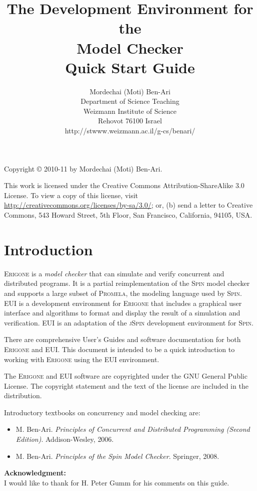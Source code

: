 \documentclass[11pt]{article}
\title{The \eui{} Development Environment for the\\
\prg{} Model Checker\\Quick Start Guide}
\author{Mordechai (Moti) Ben-Ari\\
Department of Science Teaching\\
Weizmann Institute of Science\\
Rehovot 76100 Israel\\
\textsf{http://stwww.weizmann.ac.il/g-cs/benari/}}
\newcommand*{\prg}{\textsc{Erigone}}
\newcommand*{\eui}{\textsc{EUI}}
\newcommand*{\spn}{\textsc{Spin}}
\newcommand*{\jsp}{\textsc{jSpin}}
\newcommand*{\prm}{\textsc{Promela}}
\begin{document}
\maketitle
\thispagestyle{empty}

\vfill

\begin{center}
Copyright \copyright{} 2010-11 by Mordechai (Moti) Ben-Ari.
\end{center}
This work is licensed under the Creative Commons Attribution-ShareAlike 3.0
License. To view a copy of this license, visit
\url{http://creativecommons.org/licenses/by-sa/3.0/}; or, (b) send a letter
to Creative Commons, 543 Howard Street, 5th Floor, San Francisco,
California, 94105, USA.

\newpage

\section{Introduction}

\prg{} is a \emph{model checker} that can simulate and verify concurrent
and distributed programs. It is a partial reimplementation of the \spn{}
model checker and supports a large subset of \prm{}, the modeling language
used by \spn{}. \eui{} is a development environment for \prg{} that
includes a graphical user interface and algorithms to format and display
the result of a simulation and verification. \eui{} is an adaptation of the
\jsp{} development environment for \spn{}.

There are comprehensive User's Guides and software documentation for
both \prg{} and \eui{}. This document is intended to be a quick
introduction to working with \prg{} using the \eui{} environment.

The \prg{} and \eui{} software are copyrighted under the \textsc{GNU}
General Public License. The copyright statement and the text of the
license are included in the distribution.

Introductory textbooks on concurrency and model checking are:

\begin{itemize}
\item M. Ben-Ari. \textit{Principles of Concurrent and Distributed Programming (Second
Edition)}. Addison-Wesley, 2006.
\item M. Ben-Ari. \textit{Principles of the Spin Model Checker}.
Springer, 2008.
\end{itemize}

\textbf{Acknowledgment:}\\I would like to thank for H. Peter Gumm for
his comments on this guide.
\end{document}
